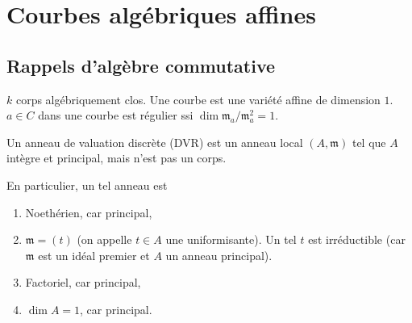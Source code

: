 \chapter{Courbes algébriques affines}
    \section{Rappels d'algèbre commutative}
        $k$ corps algébriquement clos. Une courbe est une variété affine de dimension $1$. $a \in C$ dans une courbe est régulier ssi $\dim \mathfrak{m}_a/\mathfrak{m}_a^2 = 1$.
        \begin{defi}
            Un anneau de valuation discrète (DVR) est un anneau local $(A, \mathfrak{m})$ tel que $A$ intègre et principal, mais n'est pas un corps.
        \end{defi}
        En particulier, un tel anneau est
        \begin{enumerate}
            \item Noethérien, car principal,
            \item $\mathfrak{m} = (t)$ (on appelle $t \in A$ une uniformisante). Un tel $t$ est irréductible (car $\mathfrak{m}$ est un idéal premier et $A$ un anneau principal).
            \item Factoriel, car principal,
            \item $\dim A = 1$, car principal.\\
        \end{enumerate}
